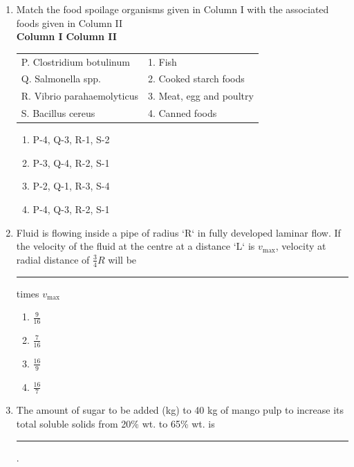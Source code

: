 \documentclass[journal,12pt,onecolumn]{IEEEtran}
\begin{document}
\begin{enumerate}[label=\arabic*.,resume]

\item Match the food spoilage organisms given in Column I with the associated foods given in Column II \\

\textbf{Column I} \hspace{4cm} \textbf{Column II} \\[6pt]

\begin{tabular}{p{6cm} p{8cm}}
P. Clostridium botulinum     & 1. Fish \\
Q. Salmonella spp.           & 2. Cooked starch foods \\
R. Vibrio parahaemolyticus   & 3. Meat, egg and poultry \\
S. Bacillus cereus           & 4. Canned foods \\
\end{tabular}


\begin{multicols}{2}
\begin{enumerate}[label=(\Alph*)]
\item P-4, Q-3, R-1, S-2
\item P-3, Q-4, R-2, S-1
\item P-2, Q-1, R-3, S-4
\item P-4, Q-3, R-2, S-1
\end{enumerate}
\end{multicols}

\item Fluid is flowing inside a pipe of radius `R` in fully developed laminar flow. If the velocity of the fluid at the centre at a distance `L` is $v_{\max}$, velocity at radial distance of $\frac{3}{4} R$ will be \rule{1cm}{0.1pt} times $v_{\max}$

\begin{multicols}{4}
\begin{enumerate}[label=(\Alph*)]
\item $\frac{9}{16}$
\item $\frac{7}{16}$
\item $\frac{16}{9}$
\item $\frac{16}{7}$
\end{enumerate}
\end{multicols}

\item The amount of sugar to be added (kg) to 40 kg of mango pulp to increase its total soluble solids from 20\% wt. to 65\% wt. is \rule{2.5cm}{0.1pt}.


\end{enumerate}
\end{document}
